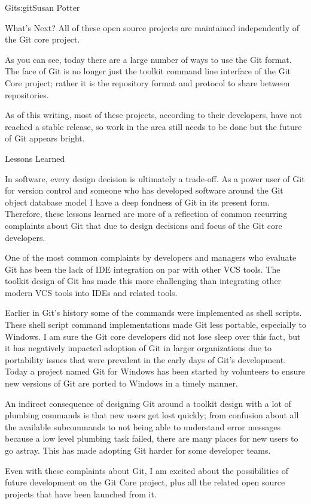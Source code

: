 \begin{aosachapter}{Git}{s:git}{Susan Potter}
\begin{aosasect1}{What's Next?}
\noindent All of these open source projects are maintained independently of the Git
core project.

As you can see, today there are a large number of ways to use the Git format.
The face of Git is no longer just the toolkit command line interface of
the Git Core project; rather it is the repository format and protocol to
share between repositories.

As of this writing, most of these projects, according to their developers, have 
not reached a stable release, so work in the area still needs to be done
but the future of Git appears bright.

\end{aosasect1}

\begin{aosasect1}{Lessons Learned}

In software, every design decision is ultimately a trade-off. As a power
user of Git for version control and someone who has developed software
around the Git object database model I have a deep fondness of Git in its
present form. Therefore, these lessons learned are more of a reflection
of common recurring complaints about Git that due to design decisions and
focus of the Git core developers.

One of the most common complaints by developers and managers who evaluate
Git has been the lack of IDE
integration on par with other VCS tools. The toolkit design of Git has made
this more challenging than integrating other modern VCS tools into IDEs
and related tools.

Earlier in Git's history some of the commands were implemented as shell
scripts. These shell script command implementations made Git less portable,
especially to Windows. I am sure the Git core developers did not lose sleep
over this fact, but it has negatively impacted adoption of Git in larger organizations
due to portability issues that were prevalent in the early days
of Git's development. Today a project named Git for Windows has been
started by volunteers to ensure new versions of Git are ported to Windows in
a timely manner.

An indirect consequence of designing Git around a toolkit design
with a lot of plumbing commands is that new users get lost quickly; from
confusion about all the available subcommands to not being able to
understand error messages because a low level plumbing task failed, there
are many places for new users to go astray. This
has made adopting Git harder for some developer teams.

Even with these complaints about Git, I am excited about the possibilities
of future development on the Git Core project, plus all the related open
source projects that have been launched from it.

\end{aosasect1}

\end{aosachapter}
